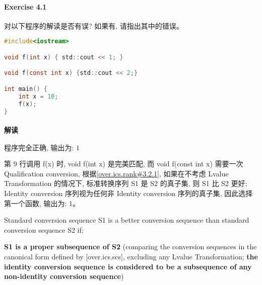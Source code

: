 \documentclass{article}
\begin{document}
	\paragraph*{Exercise 4.1} 
	
	对以下程序的解读是否有误?	如果有, 请指出其中的错误。
	
	\begin{lstlisting}[language=C]  		
#include<iostream>

void f(int x) { std::cout << 1; }

void f(const int x) {std::cout << 2;}

int main() {
	int x = 10;
	f(x);
}
	\end{lstlisting}
	
	
	\paragraph*{解读} $\boxed{\text{程序完全正确, 输出为: 1}} $
	
	第 9 行调用 f(x) 时, void f(int x) 是完美匹配, 而 void f(const int x) 需要一次 Qualification conversion, 根据\href{https://timsong-cpp.github.io/cppwp/n4659/over.ics.rank#3.2.1}{[over.ics.rank\#3.2.1]}, 如果在不考虑 Lvalue Transformation 的情况下, 标准转换序列 S1 是 S2 的真子集, 则 S1 比 S2 更好; Identity conversion 序列视为任何非 Identity conversion 序列的真子集, 因此选择第一个函数, 输出为: 1。
	
	\begin{lightgrayleftbar}
		Standard conversion sequence S1 is a better conversion sequence than standard conversion sequence S2 if:
		
		\textbf{S1 is a proper subsequence of S2} (comparing the conversion sequences in the canonical form defined by [over.ics.scs], excluding any Lvalue Transformation; \textbf{the identity conversion sequence is considered to be a subsequence of any non-identity conversion sequence})
	\end{lightgrayleftbar}

	
\end{document}
